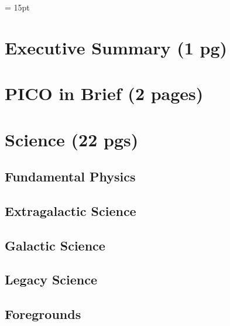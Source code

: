 \documentclass[12pt]{article}
\begin{document}


\setlength{\baselineskip}{0.96\baselineskip} %
\setlength{\parskip}{1.\parskip}

\parindent = 15pt

\tableofcontents

\setcounter{page}{0}
\setcounter{figure}{0}

\newpage

\section{Executive Summary (1 pg)} 


\section{PICO in Brief (2 pages)}


\section{Science (22 pgs)}

\subsection{Fundamental Physics}


\subsection{Extragalactic Science}


\subsection{Galactic Science}


\subsection{Legacy Science}


\subsection{Foregrounds}

\end{document}
